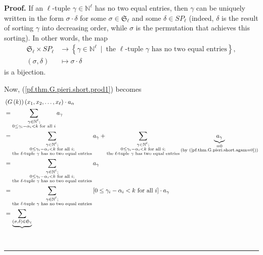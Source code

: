 \documentclass[numbers=enddot,12pt,final,onecolumn,notitlepage]{scrartcl}%
\theoremstyle{definition}
\newenvironment{proof}[1][Proof]{\noindent\textbf{#1.} }{\ \rule{0.5em}{0.5em}}
\let\sumnonlimits\sum
\renewcommand{\sum}{\sumnonlimits\limits}
\newenvironment{vershort}{}{}
\begin{document}
\begin{vershort}
\begin{proof}
If an $\ell$-tuple $\gamma\in\mathbb{N}^{\ell}$ has no two equal entries, then
$\gamma$ can be uniquely written in the form $\sigma\cdot\delta$ for some
$\sigma\in\mathfrak{S}_{\ell}$ and some $\delta\in SP_{\ell}$ (indeed,
$\delta$ is the result of sorting $\gamma$ into decreasing order, while
$\sigma$ is the permutation that achieves this sorting). In other words, the
map%
\begin{align}
\mathfrak{S}_{\ell}\times SP_{\ell}  &  \rightarrow\left\{  \gamma
\in\mathbb{N}^{\ell}\ \mid\ \text{the }\ell\text{-tuple }\gamma\text{ has no
two equal entries}\right\}  ,\nonumber\\
\left(  \sigma,\delta\right)   &  \mapsto\sigma\cdot\delta
\label{pf.thm.G.pieri.short.SSPbbij}%
\end{align}
is a bijection.

Now, (\ref{pf.thm.G.pieri.short.prod1}) becomes%
\begin{align}
&  \left(  G\left(  k\right)  \right)  \left(  x_{1},x_{2},\ldots,x_{\ell
}\right)  \cdot a_{\alpha}\nonumber\\
&  =\sum_{\substack{\gamma\in\mathbb{N}^{\ell};\\0\leq\gamma_{i}-\alpha
_{i}<k\text{ for all }i}}a_{\gamma}\nonumber\\
&  =\sum_{\substack{\gamma\in\mathbb{N}^{\ell};\\0\leq\gamma_{i}-\alpha
_{i}<k\text{ for all }i;\\\text{the }\ell\text{-tuple }\gamma\text{ has no two
equal entries}}}a_{\gamma}+\sum_{\substack{\gamma\in\mathbb{N}^{\ell}%
;\\0\leq\gamma_{i}-\alpha_{i}<k\text{ for all }i;\\\text{the }\ell\text{-tuple
}\gamma\text{ has two equal entries}}}\underbrace{a_{\gamma}}%
_{\substack{=0\\\text{(by (\ref{pf.thm.G.pieri.short.agam=0}))}}}\nonumber\\
&  =\sum_{\substack{\gamma\in\mathbb{N}^{\ell};\\0\leq\gamma_{i}-\alpha
_{i}<k\text{ for all }i;\\\text{the }\ell\text{-tuple }\gamma\text{ has no two
equal entries}}}a_{\gamma}\nonumber\\
&  =\sum_{\substack{\gamma\in\mathbb{N}^{\ell};\\\text{the }\ell\text{-tuple
}\gamma\text{ has no two equal entries}}}\left[  0\leq\gamma_{i}-\alpha
_{i}<k\text{ for all }i\right]  \cdot a_{\gamma}\nonumber\\
&  =\underbrace{\sum_{\left(  \sigma,\delta\right)  \in\mathfrak{S}_{\ell
}}}
\end{align}
\end{proof}
\end{vershort}
\end{document}
